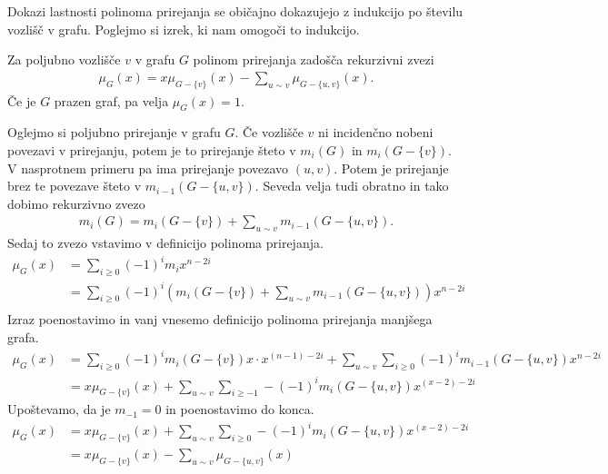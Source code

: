 Dokazi lastnosti polinoma prirejanja se običajno dokazujejo z indukcijo po številu vozlišč v grafu. Poglejmo si izrek, ki nam omogoči to indukcijo.
\begin{izrek}
    Za poljubno vozlišče \(v\) v grafu \(G\) polinom prirejanja zadošča rekurzivni zvezi
    \begin{align*}
        \mu_G(x) = x \mu_{G-\{v\}}(x) - \sum_{u\sim v} \mu_{G-\{u, v\}}(x).
    \end{align*}
    Če je \(G\) prazen graf, pa velja \(\mu_G(x) = 1\).
\end{izrek}
\begin{dokaz}
    Oglejmo si poljubno prirejanje v grafu \(G\). Če vozlišče \(v\) ni incidenčno nobeni povezavi v prirejanju, potem je to prirejanje šteto v \(m_i(G)\) in \(m_i({G-\{v\}})\). V nasprotnem primeru pa ima prirejanje povezavo \((u, v)\). Potem je prirejanje brez te povezave šteto v \(m_{i-1}({G-\{u, v\}})\). Seveda velja tudi obratno in tako dobimo rekurzivno zvezo
    \begin{align*}
        m_i(G) = m_i({G-\{v\}}) + \sum_{u\sim v} m_{i-1}({G-\{u, v\}}).
    \end{align*}
    Sedaj to zvezo vstavimo v definicijo polinoma prirejanja.
    \begin{align*}
        \mu_G(x) & = \sum_{i\geq 0} (-1)^i m_i x^{n-2i}                                                                                             \\
                 & = \sum_{i\geq 0} (-1)^i \left( m_i({G-\{v\}}) + \sum_{u\sim v} m_{i-1}({G-\{u, v\}}) \right) x^{n-2i}                            \\
    \end{align*}
    Izraz poenostavimo in vanj vnesemo definicijo polinoma prirejanja manjšega grafa.
    \begin{align*}
        \mu_G(x) & = \sum_{i\geq 0} (-1)^i m_i({G-\{v\}}) x\cdot x^{(n-1)-2i} + \sum_{u\sim v} \sum_{i\geq 0} (-1)^i m_{i-1}({G-\{u, v\}}) x^{n-2i} \\
                 & = x \mu_{G-\{v\}}(x) + \sum_{u\sim v} \sum_{i \geq -1} -(-1)^i m_{i}(G-\{u, v\}) x^{(x-2)-2i}
    \end{align*}
    Upoštevamo, da je \(m_{-1} = 0\) in poenostavimo do konca.
    \begin{align*}
        \mu_G(x) & = x \mu_{G-\{v\}}(x) + \sum_{u\sim v} \sum_{i \geq 0} -(-1)^i m_{i}(G-\{u, v\}) x^{(x-2)-2i} \\
                 & = x \mu_{G-\{v\}}(x) - \sum_{u\sim v} \mu_{G-\{u, v\}}(x)
    \end{align*}
\end{dokaz}

